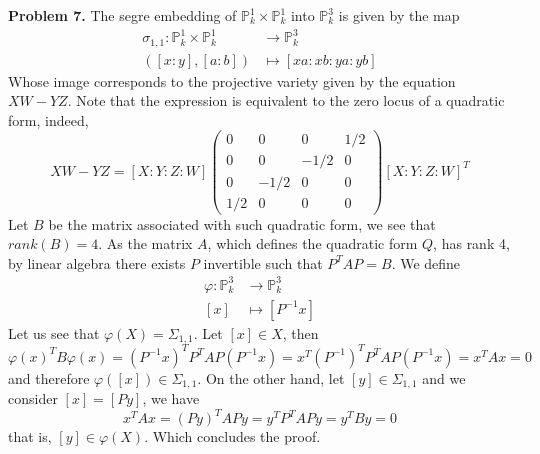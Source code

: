 \documentclass{article}
\def \P {\mathbb{P}}
\begin{document}
\vspace{5mm}
\noindent\textbf{Problem 7.} The segre embedding of $\P_{k}^{1}\times\P_{k}^{1}$ into $\P_{k}^{3}$
is given by the map
\begin{align*}
    \sigma_{1,1}:\P_{k}^{1}\times\P_{k}^{1} &\to \P_{k}^{3} \\
    ([x:y],[a:b]) &\mapsto [xa:xb:ya:yb]
\end{align*}
Whose image corresponds to the projective variety given by the equation $XW-YZ$. Note that the
expression is equivalent to the zero locus of a quadratic form, indeed,
\begin{equation*}
    XW-YZ=[X:Y:Z:W]\begin{pmatrix}
        0 & 0 & 0 & 1/2 \\
        0 & 0 & -1/2 & 0 \\
        0 & -1/2 & 0 & 0 \\
        1/2 & 0 &  0 & 0
    \end{pmatrix}[X:Y:Z:W]^{T}
\end{equation*}
Let $B$ be the matrix associated with such quadratic form, we see that $rank(B)=4$. As the matrix 
$A$, which defines the quadratic form $Q$, has rank 4, by linear algebra there exists $P$ 
invertible such that $P^{T}AP=B$. We define
\begin{align*}
    \varphi:\P_{k}^{3} &\to \P_{k}^{3} \\
    [x] &\mapsto [P^{-1}x]
\end{align*}
Let us see that $\varphi(X)=\Sigma_{1,1}$. Let $[x]\in X$, then
\begin{equation*}
    \varphi(x)^{T}B\varphi(x)=(P^{-1}x)^{T}P^{T}AP(P^{-1}x)=x^{T}(P^{-1})^{T}P^{T}AP(P^{-1}x)
    =x^{T}Ax=0
\end{equation*}
and therefore $\varphi([x])\in\Sigma_{1,1}$. On the other hand, let $[y]\in\Sigma_{1,1}$ and we 
consider $[x]=[Py]$, we have
\begin{equation*}
    x^{T}Ax=(Py)^{T}APy=y^{T}P^{T}APy=y^{T}By=0
\end{equation*}
that is, $[y]\in\varphi(X)$. Which concludes the proof.

\end{document}
